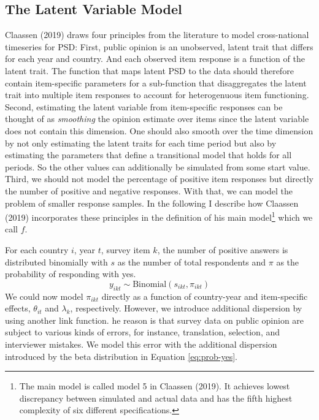 \documentclass[12pt,english,a4paper,oneside]{article}
\theoremstyle{definition}
\theoremstyle{definition}
\theoremstyle{definition}
\theoremstyle{definition}
\theoremstyle{remark}
\begin{document}
\hypertarget{the-latent-variable-model}{%
\subsection{The Latent Variable Model}\label{the-latent-variable-model}}

Claassen (2019) draws four principles from the literature to model cross-national timeseries for PSD: First, public opinion is an unobserved, latent trait that differs for each year and country. And each observed item response is a function of the latent trait. The function that maps latent PSD to the data should therefore contain item-specific parameters for a sub-function that disaggregates the latent trait into multiple item responses to account for heterogenuous item functioning. Second, estimating the latent variable from item-specific responses can be thought of as \emph{smoothing} the opinion estimate over items since the latent variable does not contain this dimension. One should also smooth over the time dimension by not only estimating the latent traits for each time period but also by estimating the parameters that define a transitional model that holds for all periods. So the other values can additionally be simulated from some start value. Third, we should not model the percentage of positive item responses but directly the number of positive and negative responses. With that, we can model the problem of smaller response samples. In the following I describe how Claassen (2019) incorporates these principles in the definition of his main model\footnote{The main model is called model 5 in Claassen (2019). It achieves lowest discrepancy between simulated and actual data and has the fifth highest complexity of six different specifications.} which we call \(f\).\newline

\noindent
For each country \(i\), year \(t\), survey item \(k\), the number of positive answers is distributed binomially with \(s\) as the number of total respondents and \(\pi\) as the probability of responding with yes.
\begin{equation}
\label{eq:num-resp}
y_{ikt} \sim \text{Binomial}(s_{ikt}, \pi_{ikt})
\end{equation}
We could now model \(\pi_{ikt}\) directly as a function of country-year and item-specific effects, \(\theta_{it}\) and \(\lambda_k\), respectively. However, we introduce additional dispersion by using another link function. he reason is that survey data on public opinion are subject to various kinds of errors, for instance, translation, selection, and interviewer mistakes. We model this error with the additional dispersion introduced by the beta distribution in Equation \eqref{eq:prob-yes}.
\end{document}
